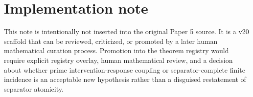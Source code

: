 \documentclass[11pt]{article}
\begin{document}
\section{Implementation note}
This note is intentionally not inserted into the original Paper 5 source. It is a v20 scaffold that can be reviewed, criticized, or promoted by a later human mathematical curation process. Promotion into the theorem registry would require explicit registry overlay, human mathematical review, and a decision about whether prime intervention-response coupling or separator-complete finite incidence is an acceptable new hypothesis rather than a disguised restatement of separator atomicity.

\printbibliography
\end{document}
